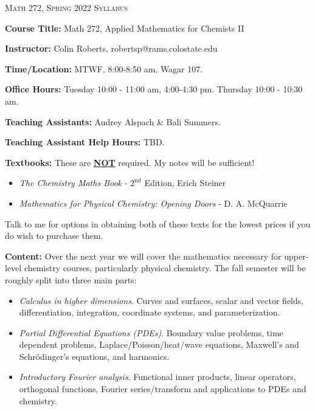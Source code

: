 \documentclass[12pt]{amsbook}
\begin{document}

\SetWatermarkText{
\begin{minipage}[c][8cm]{8cm}
\begin{center}

\end{center}
\end{minipage}
}




\begin{center}
   \textsc{\large Math 272, Spring 2022 Syllabus}
\end{center}
\vspace{.5cm}

\textbf{Course Title:} Math 272, Applied Mathematics for Chemists II

\textbf{Instructor:} Colin Roberts, robertsp@rams.colostate.edu

\textbf{Time/Location:} MTWF, 8:00-8:50 am, Wagar 107.

\textbf{Office Hours:} Tuesday 10:00 - 11:00 am, 4:00-4:30 pm. Thursday 10:00 - 10:30 am.

\textbf{Teaching Assistants:} Audrey Alspach \& Bali Summers.

\textbf{Teaching Assistant Help Hours:} TBD.

\textbf{Textbooks:} These are \underline{\textbf{NOT}} required.  My notes will be sufficient!
\begin{itemize}
    \item \emph{The Chemistry Maths Book} - $2^{\text{nd}}$ Edition, Erich Steiner
    \item \emph{Mathematics for Physical Chemistry: Opening Doors} - D. A. McQuarrie
\end{itemize}
Talk to me for options in obtaining both of these texts for the lowest prices if you do wish to purchase them.

\textbf{Content:} Over the next year we will cover the mathematics necessary for upper-level chemistry courses, particularly physical chemistry. The fall semester will be roughly split into three main parts:
\begin{itemize}
    \item \emph{Calculus in higher dimensions}. Curves and surfaces, scalar and vector fields, differentiation, integration, coordinate systems, and parameterization.
    \item \emph{Partial Differential Equations (PDEs)}. Boundary value problems, time dependent problems, Laplace/Poisson/heat/wave equations, Maxwell's and Schr\"odinger's equations, and harmonics.
    \item \emph{Introductory Fourier analysis}. Functional inner products, linear operators, orthogonal functions, Fourier series/transform and applications to PDEs and chemistry.
\end{itemize}
\end{document}
